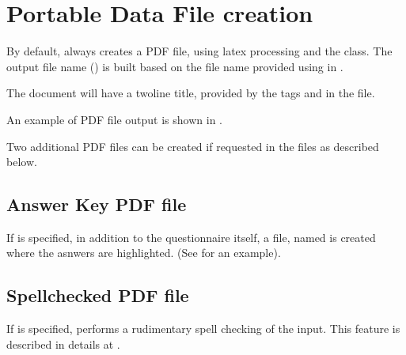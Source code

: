 \documentclass[letterpaper,10pt,english]{sphinxmanual}
\begin{document}
\chapter{Portable Data File creation}
\label{\detokenize{pdf:portable-data-file-creation}}\label{\detokenize{pdf:pdf-label}}\label{\detokenize{pdf::doc}}
By default,  always creates a PDF file, using latex processing and the  class. The output file name () is built based on the  file name provided using  in .

The document will have a two\sphinxhyphen{}line title, provided by the tags  and  in the  file.

An example of PDF file output is shown in {\hyperref[\detokenize{Full Example:example}]{}}.

Two additional PDF files can be created if requested in the  files as described below.


\section{Answer Key PDF file}
\label{\detokenize{pdf:answer-key-pdf-file}}
If  is specified, in addition to the questionnaire itself, a file, named  is created where the  asnwers are highlighted. (See  {\hyperref[\detokenize{Full Example:example}]{}} for an example).


\section{Spellchecked PDF file}
\label{\detokenize{pdf:spellchecked-pdf-file}}
If  is specified,  performs a rudimentary spell checking of the input. This feature is described in details at {\hyperref[\detokenize{spellcheck:spellcheck-label}]{}}.
\end{document}
